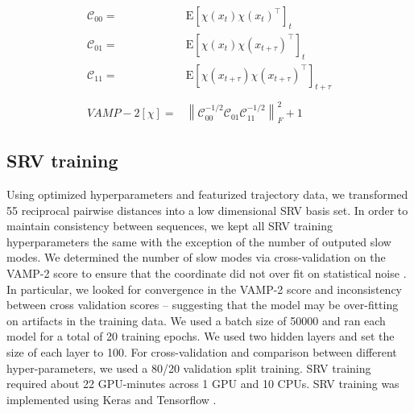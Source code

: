 \documentclass[journal=jpcbfk,manuscript=article]{achemso}
\newcommand{\Expect}[1]{\mathrm{E}\left[#1\right]}
\newcommand{\norm}[1]{\left\lVert#1\right\rVert}
\begin{document}
\begin{align*}
 	\mathscr{C}_{00}=&\Expect{\chi(x_t)\chi(x_t)^\intercal}_t\\
 	\mathscr{C}_{01}=&\Expect{\chi(x_t)\chi(x_{t+\tau})^\intercal}_t\\
 	\mathscr{C}_{11}=&\Expect{\chi(x_{t+\tau})\chi(x_{t+\tau})^\intercal}_{t+\tau}\\
	\\
 	VAMP-2[\chi]=&\norm{\mathscr{C}_{00}^{-1/2}\mathscr{C}_{01}\mathscr{C}_{11}^{-1/2}}_F^2 +1
\end{align*}\label{CK1}

\subsection{SRV training}

Using optimized hyperparameters and featurized trajectory data, we transformed 55 reciprocal pairwise distances into a low dimensional SRV basis set. In order to maintain consistency between sequences, we kept all SRV training hyperparameters the same with the exception of the number of outputed slow modes. We determined the number of slow modes via cross-validation on the VAMP-2 score to ensure that the coordinate did not over fit on statistical noise \citep{McGibbon2015VariationalKinetics}. In particular, we looked for convergence in the VAMP-2 score and inconsistency between cross validation scores -- suggesting that the model may be over-fitting on artifacts in the training data. We used a batch size of 50000 and ran each model for a total of 20 training epochs. We used two hidden layers and set the size of each layer to 100. For cross-validation and comparison between different hyper-parameters, we used a 80/20 validation split training. SRV training required about 22 GPU-minutes across 1 GPU and 10 CPUs. SRV training was implemented using Keras and Tensorflow \citep{KerasGithub.Com, Abadi2016TensorFlow:Systems}.
\end{document}
